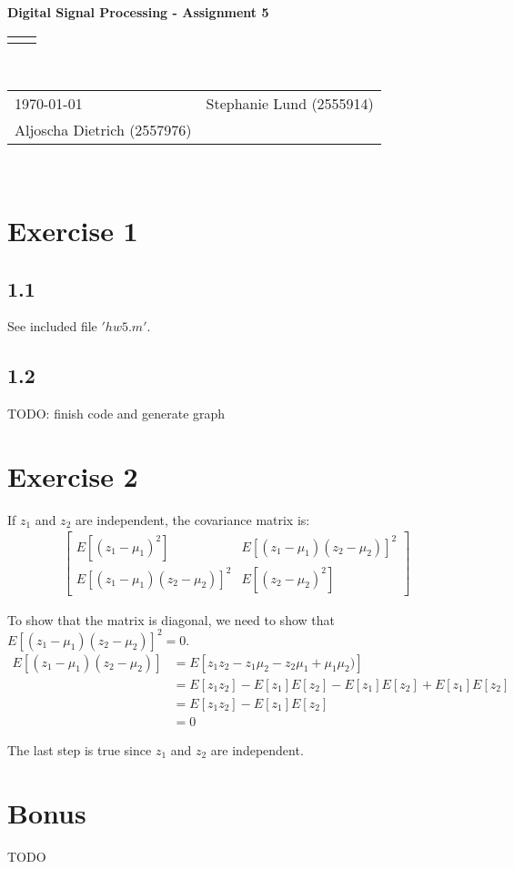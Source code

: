 \documentclass[12pt]{article}
\renewcommand{\title}[1]{\textbf{#1}\\}
\renewcommand{\line}{\begin{tabularx}{\textwidth}{X>{\raggedleft}X}\hline\\\end{tabularx}\\[-0.5cm]}
\newcommand{\leftright}[2]{\begin{tabularx}{\textwidth}{X>{\raggedleft}X}#1%
& #2\\\end{tabularx}\\[-0.5cm]}
\begin{document}
\title{Digital Signal Processing - Assignment 5}
\line
\leftright{\today}{Stephanie Lund (2555914)\\Aljoscha Dietrich (2557976)} %

\section*{Exercise 1}

\subsection*{1.1}
See included file $'hw5.m'$.

\subsection*{1.2}
TODO: finish code and generate graph

\section*{Exercise 2}
If $z_1$ and $z_2$ are independent, the covariance matrix is:
\begin{align*}
\begin{bmatrix}
E[(z_1 - \mu_1)^2] & E[(z_1 - \mu_1)(z_2 - \mu_2)]^2 \\
E[(z_1 - \mu_1)(z_2 - \mu_2)]^2 & E[(z_2 - \mu_2)^2] 
\end{bmatrix}
\end{align*}

To show that the matrix is diagonal, we need to show that $E[(z_1 - \mu_1)(z_2 - \mu_2)]^2 = 0$.
\begin{align*}
E[(z_1 - \mu_1)(z_2 - \mu_2)] &= E[z_1 z_2 - z_1 \mu_2 - z_2 \mu_1 + \mu_1 \mu_2)]\\
&= E[z_1 z_2] - E[z_1]E[z_2] - E[z_1]E[z_2] + E[z_1]E[z_2] \\
&= E[z_1 z_2] - E[z_1]E[z_2] \\
&= 0
\end{align*}

The last step is true since $z_1$ and $z_2$ are independent.\\

\section*{Bonus}
TODO
\end{document}

